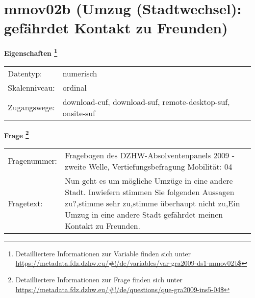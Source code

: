 
    \setcounter{footnote}{0}

    \vspace*{-1.8cm}
	\section{mmov02b (Umzug (Stadtwechsel): gefährdet Kontakt zu Freunden)}
	\label{section:mmov02b}



    \vspace*{0.5cm}
    \noindent\textbf{Eigenschaften
	\footnote{Detailliertere Informationen zur Variable finden sich unter
		\url{https://metadata.fdz.dzhw.eu/\#!/de/variables/var-gra2009-ds1-mmov02b$}}}\\
	\begin{tabularx}{\hsize}{@{}lX}
	Datentyp: & numerisch \\
	Skalenniveau: & ordinal \\
	Zugangswege: &
	  download-cuf, 
	  download-suf, 
	  remote-desktop-suf, 
	  onsite-suf
 \\
    \end{tabularx}



				\vspace*{0.5cm}
                \noindent\textbf{Frage
	                \footnote{Detailliertere Informationen zur Frage finden sich unter
		              \url{https://metadata.fdz.dzhw.eu/\#!/de/questions/que-gra2009-ins5-04$}}}\\
				\begin{tabularx}{\hsize}{@{}lX}
					Fragenummer: &
					  Fragebogen des DZHW-Absolventenpanels 2009 - zweite Welle, Vertiefungsbefragung Mobilität:
					  04
 \\
					Fragetext: & Nun geht es um mögliche Umzüge in eine andere Stadt. Inwiefern stimmen Sie folgenden Aussagen zu?,stimme sehr zu,stimme überhaupt nicht zu,Ein Umzug in eine andere Stadt gefährdet meinen Kontakt zu Freunden. \\
				\end{tabularx}





